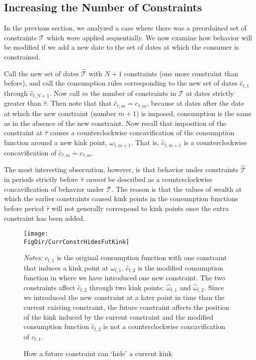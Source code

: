 \documentclass[titlepage]{\econtex}
\providecommand{\wAlt}{\omega}
\begin{document}
\subsection{Increasing the Number of Constraints}
\label{subsec:IncreaseNumConstr}

In the previous section, we analyzed a case where there was a preordained set
of constraints $\mathcal{T}$ which were applied sequentially.  We now examine how behavior will be modified if we add a new date to the set of dates at which the consumer is constrained.

Call the new set of dates $\hat{\mathcal{T}}$ with $N+1$ constraints (one more constraint than before), and call the consumption rules corresponding to the new set of dates
$\hat{c}_{t,1}$ through $\hat{c}_{t,N+1}$. Now call $m$ the
number of constraints in $\mathcal{T}$ at dates strictly
greater than $\hat{\tau}$.  Then note that that $\hat{c}_{\hat{\tau},m} =
c_{\hat{\tau},m}$, because at dates after the date at which the new constraint (number $m+1$) is
imposed, consumption is the same as in the absence of the new constraint.
Now recall that imposition of the constraint at $\hat{\tau}$ causes a counterclockwise concavification of the consumption function around a new kink point, $\wAlt_{\hat{\tau},m+1}$. That is, $\hat{c}_{\hat{\tau},m+1}$ is a counterclockwise concavification of $\hat{c}_{\hat{\tau},m} = c_{\hat{\tau},m}$.

The most interesting observation, however, is that behavior under
constraints $\hat{\mathcal{T}}$ in periods strictly before
$\hat{\tau}$ \textit{cannot} be described as a counterclockwise
concavification of behavior under $\mathcal{T}$.  The reason
is that the values of wealth at which the earlier constraints caused
kink points in the consumption functions before period $\hat{\tau}$ will not generally correspond to kink points once the extra constraint has been added.

\hypertarget{CurrConstrHidesFutKink}{}

\begin{figure}[ht]
{\centering \texttt{[image: \\FigDir/CurrConstrHidesFutKink]}}
\caption{How a future constraint can `hide' a current kink}
\footnotesize {\emph{Notes:} $c_{t,1}$ is the original consumption function with one constraint that induces a kink point at $\omega_{t,1}$. $\hat{c}_{t,2}$ is the modified consumption function in where we have introduced one new constraint. The two constraints affect $\hat{c}_{t,2}$ through two kink points: $\hat{\omega}_{t,1}$ and $\hat{\omega}_{t,2}$. Since we introduced the new constraint at a later point in time than the current existing constraint, the future constraint affects the position of the kink induced by the current constraint and the modified consumption function $\hat{c}_{t,2}$ is not a counterclockwise concavification of ${c}_{t,1}$.}
\label{fig:LCtHidesLCtpn}
\end{figure}
\end{document}
